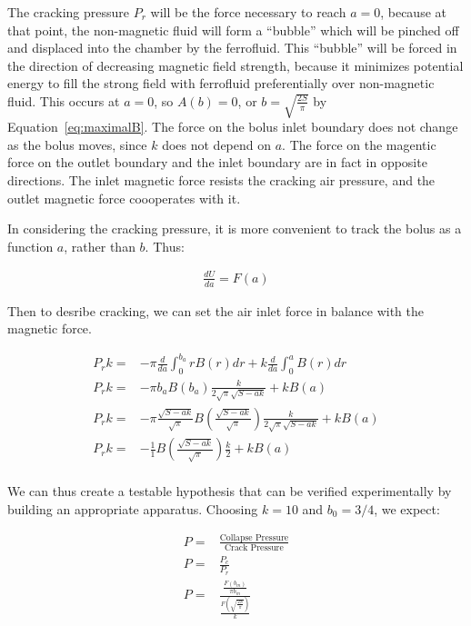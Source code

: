 \documentclass{asme2ej}
\begin{document}
The cracking pressure $P_r$ will be the force necessary to reach $a = 0$, because at that point,
the non-magnetic fluid will form a ``bubble'' which will be pinched off and displaced into the chamber
by the ferrofluid. This ``bubble'' will be forced in the direction of decreasing magnetic field strength,
because it minimizes potential energy to fill the strong field with ferrofluid preferentially over
non-magnetic fluid. This occurs at $a = 0$, so $A(b) = 0$, or $b = \sqrt{\frac{2S}{\pi}}$ by Equation~\ref{eq:maximalB}.
The force on the bolus inlet boundary does not change as the bolus moves, since $k$ does not
depend on $a$.
The force on the magentic force on the outlet boundary and the inlet boundary
are in fact in opposite directions. The inlet magnetic force resists the cracking
air pressure, and the outlet magnetic force coooperates with it.

In considering the cracking pressure, it is more convenient to track the bolus as a function $a$,
rather than $b$. Thus:

\begin{align}
  \frac{d U}{da} =  F(a)
\end{align}

Then to desribe cracking, we can set the air inlet force in balance with the magnetic force.

\begin{align}
  P_r k = & - \pi \frac{d }{da} \int_0^{b_a} r B(r) dr  + k \frac{d }{da} \int_0^a B(r) dr \\
  P_r k = & - \pi b_a B(b_a) \frac{k}{2 \sqrt{\pi} \sqrt{S - a k}} + k B(a) \\
  P_r k = & - \pi \frac{\sqrt{S - ak}}{\sqrt{\pi}} B(\frac{\sqrt{S - ak}}{\sqrt{\pi}}) \frac{k}{2 \sqrt{\pi} \sqrt{S - a k}} + k B(a) \\
  P_r k = & -  \frac{1}{1} B(\frac{\sqrt{S - ak}}{\sqrt{\pi}}) \frac{k}{2} + k B(a) \\
\end{align}

We can thus create a testable hypothesis that can be verified experimentally by building an appropriate
apparatus. Choosing $k = 10$ and $b_0 = 3/4$, we expect:

\begin{align}
  P = & \frac{\text{Collapse Pressure}}{\text{Crack Pressure}} \\
  P = & \frac{P_c}{P_r} \\
  P = & \frac{\frac{F(b_m)}{\pi b_m}}{\frac{F(\sqrt{\frac{2S}{\pi}})}{k}}
\end{align}
\end{document}
